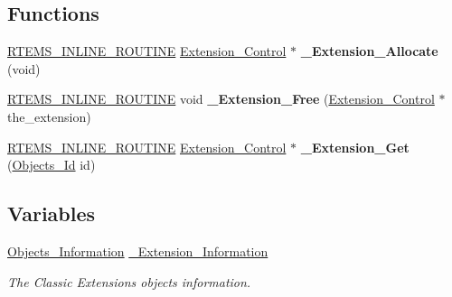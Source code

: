 \subsection*{Functions}
\begin{DoxyCompactItemize}
\item 
\mbox{\label{group__ClassicUserExtensionsImpl_gaa180c344c3b1a2797be1beda9812a2cc}} 
\mbox{\hyperlink{group__RTEMSScoreBaseDefs_gac216239df231d5dbd15e3520b0b9313f}{R\+T\+E\+M\+S\+\_\+\+I\+N\+L\+I\+N\+E\+\_\+\+R\+O\+U\+T\+I\+NE}} \mbox{\hyperlink{structExtension__Control}{Extension\+\_\+\+Control}} $\ast$ {\bfseries \+\_\+\+Extension\+\_\+\+Allocate} (void)
\item 
\mbox{\label{group__ClassicUserExtensionsImpl_ga4b09dee843c81474c1d3d99cc7788973}} 
\mbox{\hyperlink{group__RTEMSScoreBaseDefs_gac216239df231d5dbd15e3520b0b9313f}{R\+T\+E\+M\+S\+\_\+\+I\+N\+L\+I\+N\+E\+\_\+\+R\+O\+U\+T\+I\+NE}} void {\bfseries \+\_\+\+Extension\+\_\+\+Free} (\mbox{\hyperlink{structExtension__Control}{Extension\+\_\+\+Control}} $\ast$the\+\_\+extension)
\item 
\mbox{\label{group__ClassicUserExtensionsImpl_ga6335b2a54ed2bac19920508333f16694}} 
\mbox{\hyperlink{group__RTEMSScoreBaseDefs_gac216239df231d5dbd15e3520b0b9313f}{R\+T\+E\+M\+S\+\_\+\+I\+N\+L\+I\+N\+E\+\_\+\+R\+O\+U\+T\+I\+NE}} \mbox{\hyperlink{structExtension__Control}{Extension\+\_\+\+Control}} $\ast$ {\bfseries \+\_\+\+Extension\+\_\+\+Get} (\mbox{\hyperlink{group__RTEMSScoreObject_ga5821f52a51072941bdd603e542d0863e}{Objects\+\_\+\+Id}} id)
\end{DoxyCompactItemize}
\subsection*{Variables}
\begin{DoxyCompactItemize}
\item 
\mbox{\label{group__ClassicUserExtensionsImpl_ga5103769194b95676ea8dec6566ba7cb5}} 
\mbox{\hyperlink{structObjects__Information}{Objects\+\_\+\+Information}} \mbox{\hyperlink{group__ClassicUserExtensionsImpl_ga5103769194b95676ea8dec6566ba7cb5}{\+\_\+\+Extension\+\_\+\+Information}}
\begin{DoxyCompactList}\small\item\em The Classic Extensions objects information. \end{DoxyCompactList}\end{DoxyCompactItemize}


